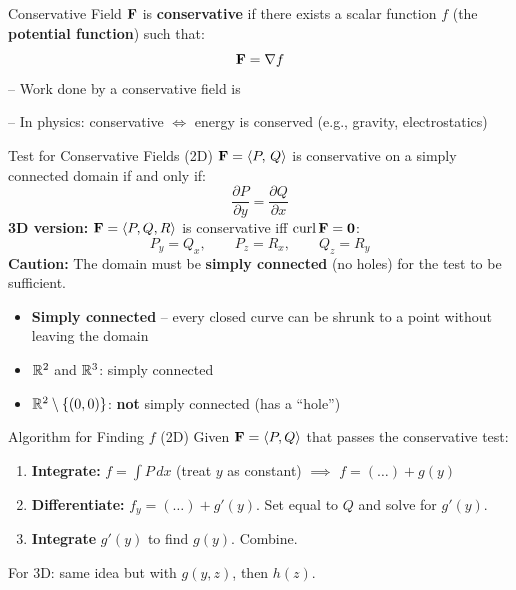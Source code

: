 \documentclass[11pt]{article}
\begin{document}

\begin{defbox}{Conservative Field}
$\mathbf{F}$ is \textbf{conservative} if there exists a scalar function $f$ (the \textbf{potential function}) such that:
\[\mathbf{F} = \nabla f\]
-- Work done by a conservative field is 

-- In physics: conservative $\iff$ energy is conserved (e.g., gravity, electrostatics)
\end{defbox}

\begin{thmbox}{Test for Conservative Fields (2D)}
$\mathbf{F} = \left\langle P,\,Q \right\rangle$ is conservative on a simply connected domain if and only if:
\[\frac{\partial P}{\partial y} = \frac{\partial Q}{\partial x}\]
\textbf{3D version:} $\mathbf{F} = \left\langle P,Q,R \right\rangle$ is conservative iff $\operatorname{curl}\mathbf{F} = \mathbf{0}$:
\[P_y = Q_x, \qquad P_z = R_x, \qquad Q_z = R_y\]
\textbf{Caution:} The domain must be \textbf{simply connected} (no holes) for the test to be sufficient.
\end{thmbox}


\begin{itemize}[nosep, leftmargin=*]
  \item \textbf{Simply connected} -- every closed curve can be shrunk to a point without leaving the domain
  \item $\mathbb{R}^2$ and $\mathbb{R}^3$: simply connected \quad\checkmark
  \item $\mathbb{R}^2 \setminus \{(0,0)\}$: \textbf{not} simply connected (has a ``hole'')
\end{itemize}


\begin{formulabox}{Algorithm for Finding $f$ (2D)}
Given $\mathbf{F} = \left\langle P,Q \right\rangle$ that passes the conservative test:
\begin{enumerate}[nosep]
  \item \textbf{Integrate:} $f = \int P\,dx$ (treat $y$ as constant) $\implies$ $f = (\ldots) + g(y)$
  \item \textbf{Differentiate:} $f_y = (\ldots) + g'(y)$. Set equal to $Q$ and solve for $g'(y)$.
  \item \textbf{Integrate} $g'(y)$ to find $g(y)$. Combine.
\end{enumerate}

For 3D: same idea but with $g(y,z)$, then $h(z)$.
\end{formulabox}
\end{document}
